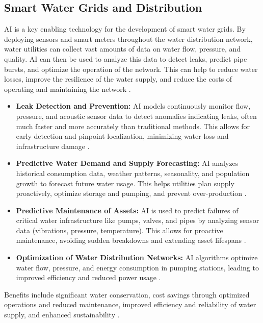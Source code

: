 \subsection{Smart Water Grids and Distribution}
AI is a key enabling technology for the development of smart water grids. By deploying sensors and smart meters throughout the water distribution network, water utilities can collect vast amounts of data on water flow, pressure, and quality. AI can then be used to analyze this data to detect leaks, predict pipe bursts, and optimize the operation of the network. This can help to reduce water losses, improve the resilience of the water supply, and reduce the costs of operating and maintaining the network \cite{hussain2024artificial}.
\begin{itemize}
    \item \textbf{Leak Detection and Prevention:} AI models continuously monitor flow, pressure, and acoustic sensor data to detect anomalies indicating leaks, often much faster and more accurately than traditional methods. This allows for early detection and pinpoint localization, minimizing water loss and infrastructure damage \cite{HealthInformaticsJournal_SmartGrids, Yenra_SmartGrids}.
    \item \textbf{Predictive Water Demand and Supply Forecasting:} AI analyzes historical consumption data, weather patterns, seasonality, and population growth to forecast future water usage. This helps utilities plan supply proactively, optimize storage and pumping, and prevent over-production \cite{ADB_SmartGrids, BarbaraTech_SmartGrids}.
    \item \textbf{Predictive Maintenance of Assets:} AI is used to predict failures of critical water infrastructure like pumps, valves, and pipes by analyzing sensor data (vibrations, pressure, temperature). This allows for proactive maintenance, avoiding sudden breakdowns and extending asset lifespans \cite{IJCRT_SmartGrids}.
    \item \textbf{Optimization of Water Distribution Networks:} AI algorithms optimize water flow, pressure, and energy consumption in pumping stations, leading to improved efficiency and reduced power usage \cite{MDPI_SmartGrids, CleanTechWater_SmartGrids}.
\end{itemize}
Benefits include significant water conservation, cost savings through optimized operations and reduced maintenance, improved efficiency and reliability of water supply, and enhanced sustainability \cite{WhiteCase_SmartGrids}.

